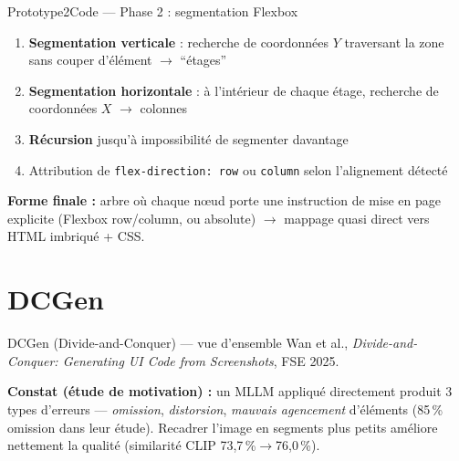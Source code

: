 \documentclass[10pt,aspectratio=169]{beamer}
\begin{document}
\begin{frame}{Prototype2Code --- Phase 2 : segmentation Flexbox}
\begin{enumerate}
  \item \textbf{Segmentation verticale} : recherche de coordonnées $Y$ traversant la zone sans couper d'élément $\to$ ``étages''
  \item \textbf{Segmentation horizontale} : à l'intérieur de chaque étage, recherche de coordonnées $X$ $\to$ colonnes
  \item \textbf{Récursion} jusqu'à impossibilité de segmenter davantage
  \item Attribution de \texttt{flex-direction: row} ou \texttt{column} selon l'alignement détecté
\end{enumerate}

\textbf{Forme finale :} arbre où chaque n\oe ud porte une instruction de mise en page explicite (Flexbox row/column, ou absolute) $\to$ mappage quasi direct vers HTML imbriqué + CSS.
\end{frame}

\section{DCGen}
\begin{frame}{DCGen (Divide-and-Conquer) --- vue d'ensemble}
\footnotesize Wan et al., \emph{Divide-and-Conquer: Generating UI Code from Screenshots}, FSE 2025.

\vspace{2mm}
\textbf{Constat (étude de motivation) :} un MLLM appliqué directement produit 3 types d'erreurs — \emph{omission}, \emph{distorsion}, \emph{mauvais agencement} d'éléments (85\,\% omission dans leur étude). Recadrer l'image en segments plus petits améliore nettement la qualité (similarité CLIP 73,7\,\%$\to$76,0\,\%).

\begin{center}
\end{center}
\end{frame}
\end{document}
